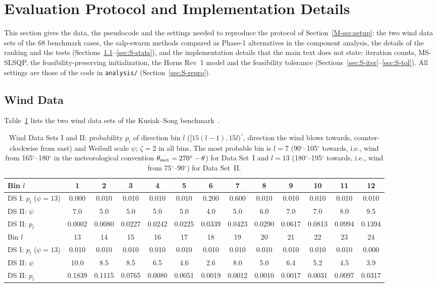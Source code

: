 \documentclass[10pt]{article}
\begin{document}
\section{Evaluation Protocol and Implementation Details}
\label{sec:S-protocol}
\label{sec:S-impl}
This section gives the data, the pseudocode and the settings needed to reproduce the protocol of Section~\ref{M-sec:setup}: the two wind data sets of the 68 benchmark cases, the salp-swarm methods compared as Phase-1 alternatives in the component analysis, the details of the ranking and the tests (Sections~\ref{sec:S-wind}--\ref{sec:S-stats}), and the implementation details that the main text does not state: iteration counts, MS-SLSQP, the feasibility-preserving initialization, the Horns Rev~1 model and the feasibility tolerance (Sections~\ref{sec:S-iter}--\ref{sec:S-tol}). All settings are those of the code in \texttt{analysis/} (Section~\ref{sec:S-repro}).

\subsection{Wind Data}
\label{sec:S-wind}
Table~\ref{tab:S-wind} lists the two wind data sets of the Kusiak--Song benchmark~\cite{Kusiak2010,Bansal2017}.
\begin{table}[!htb]
\centering
\caption{Wind Data Sets I and II: probability $p_l$ of direction bin $l$ ($[15(l-1),15l)^\circ$, direction the wind blows towards, counter-clockwise from east) and Weibull scale $\psi$; $\zeta=2$ in all bins. The most probable bin is $l=7$ (90$^\circ$--105$^\circ$ towards, i.e., wind from 165$^\circ$--180$^\circ$ in the meteorological convention $\theta_{\rm met}=270^\circ-\theta$) for Data Set~I and $l=13$ (180$^\circ$--195$^\circ$ towards, i.e., wind from 75$^\circ$--90$^\circ$) for Data Set~II.}
\label{tab:S-wind}
\scriptsize\setlength{\tabcolsep}{3.2pt}
\begin{tabular}{l*{12}{c}}
\toprule
Bin $l$ & 1 & 2 & 3 & 4 & 5 & 6 & 7 & 8 & 9 & 10 & 11 & 12 \\
\midrule
DS I: $p_l$ ($\psi=13$) & 0.000 & 0.010 & 0.010 & 0.010 & 0.010 & 0.200 & 0.600 & 0.010 & 0.010 & 0.010 & 0.010 & 0.010 \\
DS II: $\psi$ & 7.0 & 5.0 & 5.0 & 5.0 & 5.0 & 4.0 & 5.0 & 6.0 & 7.0 & 7.0 & 8.0 & 9.5 \\
DS II: $p_l$ & 0.0002 & 0.0080 & 0.0227 & 0.0242 & 0.0225 & 0.0339 & 0.0423 & 0.0290 & 0.0617 & 0.0813 & 0.0994 & 0.1394 \\
\midrule
Bin $l$ & 13 & 14 & 15 & 16 & 17 & 18 & 19 & 20 & 21 & 22 & 23 & 24 \\
\midrule
DS I: $p_l$ ($\psi=13$) & 0.010 & 0.010 & 0.010 & 0.010 & 0.010 & 0.010 & 0.010 & 0.010 & 0.010 & 0.010 & 0.010 & 0.000 \\
DS II: $\psi$ & 10.0 & 8.5 & 8.5 & 6.5 & 4.6 & 2.6 & 8.0 & 5.0 & 6.4 & 5.2 & 4.5 & 3.9 \\
DS II: $p_l$ & 0.1839 & 0.1115 & 0.0765 & 0.0080 & 0.0051 & 0.0019 & 0.0012 & 0.0010 & 0.0017 & 0.0031 & 0.0097 & 0.0317 \\
\bottomrule
\end{tabular}
\end{table}
\end{document}
